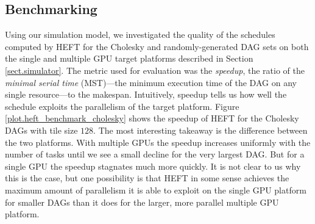 \documentclass[runningheads]{llncs}
\begin{document}
\subsection{Benchmarking}
\label{subsect.benchmarking}

Using our simulation model, we investigated the quality of the schedules computed by HEFT for the Cholesky and randomly-generated DAG sets on both the single and multiple GPU target platforms described in Section \ref{sect.simulator}. The metric used for evaluation was the {\em speedup}, the ratio of the {\em minimal serial time} (MST)---the minimum execution time of the DAG on any single resource---to the makespan. Intuitively, speedup tells us how well the schedule exploits the parallelism of the target platform. Figure \ref{plot.heft_benchmark_cholesky} shows the speedup of HEFT for the Cholesky DAGs with tile size $128$. The most interesting takeaway is the difference between the two platforms. With multiple GPUs the speedup increases uniformly with the number of tasks until we see a small decline for the very largest DAG. But for a single GPU the speedup stagnates much more quickly. It is not clear to us why this is the case, but one possibility is that HEFT in some sense achieves the maximum amount of parallelism it is able to exploit on the single GPU platform for smaller DAGs than it does for the larger, more parallel multiple GPU platform.  
\end{document}
